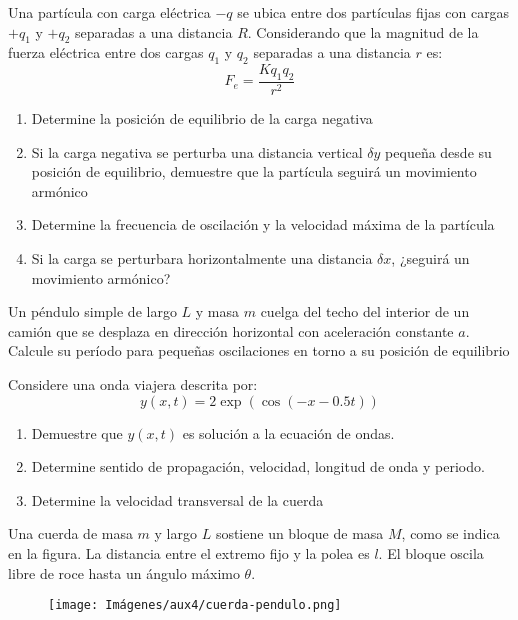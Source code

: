 \documentclass[letterpaper,11pt]{article}
\begin{document}
\vspace{-1cm}
\begin{enumerate}\setlength{\itemsep}{0.4cm}

\item[]



\item Una partícula con carga eléctrica $-q$ se ubica entre dos partículas fijas con cargas $+q_1$ y $+q_2$ separadas a una distancia $R$. Considerando que la magnitud de la fuerza eléctrica entre dos cargas $q_1$ y $q_2$ separadas a una distancia $r$ es:
$$F_e = \frac{K q_1 q_2}{r^2}$$

\begin{enumerate}
    \item Determine la posición de equilibrio de la carga negativa

    \item Si la carga negativa se perturba una distancia vertical $\delta y$ pequeña desde su posición de equilibrio, demuestre que la partícula seguirá un movimiento armónico

    \item Determine la frecuencia de oscilación y la velocidad máxima de la partícula

    \item Si la carga se perturbara horizontalmente una distancia $\delta x$, ¿seguirá un movimiento armónico?
\end{enumerate}

\item Un péndulo simple de largo $L$ y masa $m$ cuelga del techo del interior de un camión que se desplaza en dirección horizontal con aceleración constante $a$. Calcule su período para pequeñas oscilaciones en torno a su posición de equilibrio

\item Considere una onda viajera descrita por:
\[ y(x,t) = 2\exp\left(\cos\left(-x-0.5t\right)\right)\]
    \begin{enumerate}
        \item Demuestre que $y(x,t)$ es solución a la ecuación de ondas.
        \item Determine sentido de propagación, velocidad, longitud de onda y periodo.
        \item Determine la velocidad transversal de la cuerda
    \end{enumerate}

\begin{minipage}{0.6\linewidth}
    \item Una cuerda  de  masa  $m$  y  largo  $L$  sostiene  un  bloque  de  masa  $M$,  como  se  indica  en la  figura. La distancia entre el extremo fijo y la polea es $l$. El bloque oscila libre de roce hasta un ángulo  máximo  $\theta$.
\end{minipage}
\hfill
\begin{minipage}{0.35\linewidth}
    \begin{figure}[H]
        \centering
        \texttt{[image: Imágenes/aux4/cuerda-pendulo.png]}
    \end{figure}
\end{minipage}


\end{enumerate}
\end{document}
